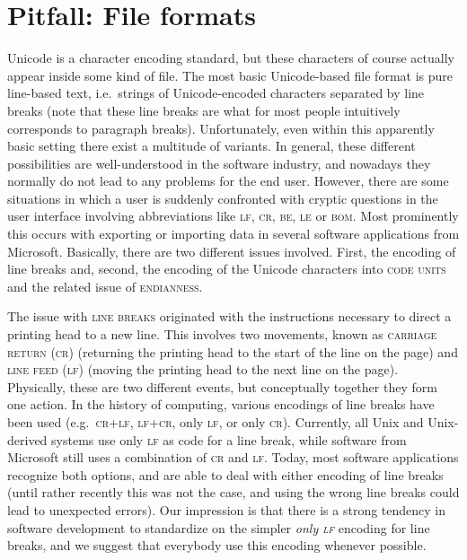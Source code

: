 \section{Pitfall: File formats}
\label{pitfall-file-formats}

Unicode is a character encoding standard, but these characters of course
actually appear inside some kind of file. The most basic Unicode-based file
format is pure line-based text, i.e.~strings of Unicode-encoded characters
separated by line breaks (note that these line breaks are what for most people
intuitively corresponds to paragraph breaks). Unfortunately, even within this
apparently basic setting there exist a multitude of variants. In general, these
different possibilities are well-understood in the software industry, and
nowadays they normally do not lead to any problems for the end user. However,
there are some situations in which a user is suddenly confronted with cryptic
questions in the user interface involving abbreviations like \textsc{lf},
\textsc{cr}, \textsc{be}, \textsc{le} or \textsc{bom}. Most prominently this
occurs with exporting or importing data in several software applications from
Microsoft. Basically, there are two different issues involved. First, the
encoding of line breaks and, second, the encoding of the Unicode characters into
\textsc{code units} and the related issue of \textsc{endianness}.

The issue with \textsc{line breaks} originated with the instructions necessary
to direct a printing head to a new line. This involves two movements, known as
\textsc{carriage return (cr)} (returning the printing head to the start of the
line on the page) and \textsc{line feed (lf)} (moving the printing head to the
next line on the page). Physically, these are two different events, but
conceptually together they form one action. In the history of computing, various
encodings of line breaks have been used (e.g.~\textsc{cr+lf}, \textsc{lf+cr},
only \textsc{lf}, or only \textsc{cr}). Currently, all Unix and Unix-derived
systems use only \textsc{lf} as code for a line break, while software from
Microsoft still uses a combination of \textsc{cr} and \textsc{lf}. Today, most
software applications recognize both options, and are able to deal with either
encoding of line breaks (until rather recently this was not the case, and using
the wrong line breaks could lead to unexpected errors). Our impression is that
there is a strong tendency in software development to standardize on the simpler
\textit{only \textsc{lf}} encoding for line breaks, and we suggest that
everybody use this encoding whenever possible.

